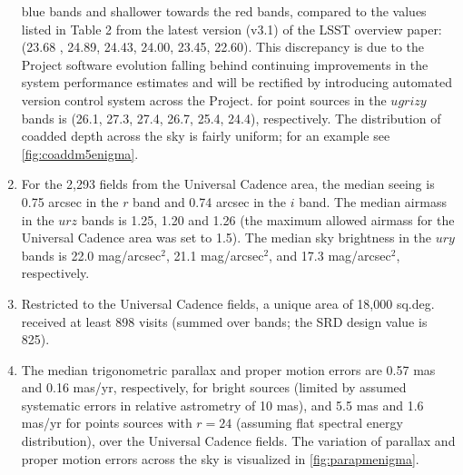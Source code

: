 \begin{enumerate}
{blue bands and shallower towards the red bands, compared to the values
listed in Table 2 from the latest version (v3.1) of the LSST overview
paper: (23.68 , 24.89, 24.43, 24.00, 23.45, 22.60). This discrepancy
is due to the Project software evolution falling behind continuing
improvements in the system performance estimates and will be rectified
by introducing automated version control system across the Project.}
for point sources in the $ugrizy$ bands is (26.1, 27.3, 27.4, 26.7,
25.4, 24.4), respectively. The distribution of coadded depth across
the sky is fairly uniform; for an example see
\autoref{fig:coaddm5enigma}.
\item For the 2,293 fields from the Universal Cadence area, the median
seeing is 0.75 arcsec in the $r$ band and 0.74 arcsec in the $i$ band.
The median airmass in the $urz$ bands is 1.25, 1.20 and 1.26 (the
maximum allowed airmass for the Universal Cadence area was set to
1.5).  The median sky brightness in the $ury$ bands is 22.0
mag/arcsec$^2$, 21.1 mag/arcsec$^2$, and 17.3 mag/arcsec$^2$,
respectively.
\item Restricted to the Universal Cadence fields, a unique area of
18,000 sq.deg. received at least 898 visits (summed over bands; the
SRD design value is 825).
\item The median trigonometric parallax and proper motion errors are
0.57 mas and 0.16 mas/yr, respectively, for bright sources (limited by
assumed systematic errors in relative astrometry of 10 mas), and 5.5
mas and 1.6 mas/yr for points sources with $r=24$ (assuming flat
spectral energy distribution), over the Universal Cadence fields. The
variation of parallax and proper motion errors across the sky is
visualized in \autoref{fig:parapmenigma}.
\end{enumerate}


